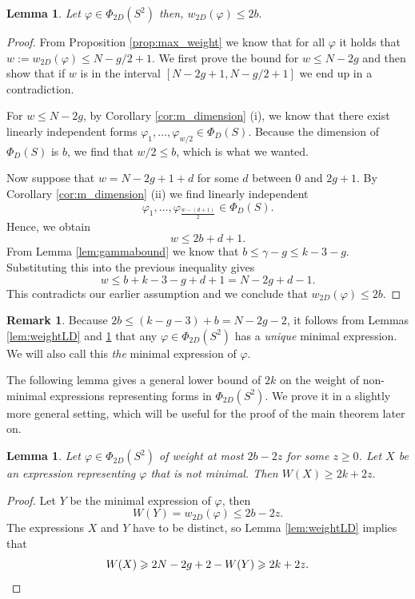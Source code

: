 \documentclass[12pt]{amsart}
\renewcommand{\leq}{\leqslant}
\renewcommand{\geq}{\geqslant}
\newtheorem{lemma}[theorem]{Lemma}
\theoremstyle{definition}
\newtheorem{remark}[theorem]{Remark}
\begin{document}
	\begin{lemma}\label{lem:2bbound}
		Let $\varphi\in \Phi_{2D}(S^2)$ then,
		$ w_{2D}(\varphi)\leq 2b. $
	\end{lemma}
	\begin{proof}
		From Proposition \ref{prop:max_weight} we know that for all $\varphi$ it holds that $w:= w_{2D}(\varphi) \leq N - g/2 + 1$. We first prove the bound for $w \leq N - 2g$ and then show that if $w$ is in the interval $[N- 2g + 1, N - g/2 + 1]$ we end up in a contradiction. 
		
		For $w \leq N - 2g$, by Corollary \ref{cor:m_dimension} (i), we know that there exist linearly independent forms $\varphi_1, \ldots, \varphi_{w/2} \in \Phi_D(S)$. Because the dimension of $\Phi_D(S)$ is $b$, we find that $w/2 \leq b$, which is what we wanted. 
		
		Now suppose that $w = N - 2g + 1 + d$ for some $d$ between $0$ and $2g + 1$. By Corollary \ref{cor:m_dimension} (ii) we find linearly independent
		$$\varphi_1, \ldots, \varphi_{\frac{w -( d + 1)}2} \in \Phi_D(S).$$ Hence, we obtain
		$$w \leq 2b + d + 1.$$ 
		From Lemma \ref{lem:gammabound} we know that $b \leq \gamma - g \leq k - 3 - g$. Substituting this into the previous inequality gives
		$$w \leq b + k - 3 - g + d + 1 = N - 2g + d - 1.$$ 
		This contradicts our earlier assumption and we conclude that $w_{2D}(\varphi) \leq 2b$. 
	\end{proof}
	
	\begin{remark}
		Because $2b \leq (k - g - 3) + b = N - 2g - 2$, it follows from Lemmas \ref{lem:weightLD} and \ref{lem:2bbound} that any $\varphi \in \Phi_{2D}(S^2)$ has a \textit{unique} minimal expression. We will also call this \textit{the} minimal expression of $\varphi$. 
	\end{remark}
	
	The following lemma gives a general lower bound of $2k$ on the weight of non-minimal expressions representing forms in $\Phi_{2D}(S^2)$. We prove it in a slightly more general setting, which will be useful for the proof of the main theorem later on.
	
	\begin{lemma}\label{lem:2kbound}
		Let $\varphi \in \Phi_{2D}(S^2)$ of weight at most $2b - 2z$ for some $z\geq 0$.  Let $X$ be an expression representing $\varphi$ that is not minimal. Then $W(X) \geq 2k + 2z.$
	\end{lemma}
	\begin{proof}
		Let $Y$ be the minimal expression of $\varphi$, then $$W(Y) = w_{2D}(\varphi) \leq 2b - 2z.$$ The expressions $X$ and $Y$ have to be distinct, so Lemma \ref{lem:weightLD} implies that 
		\begin{equation*}
			W(X) \geq 2N - 2g + 2 - W(Y) \geq 2k + 2z. \qedhere
		\end{equation*}
	\end{proof}
	
\end{document}
